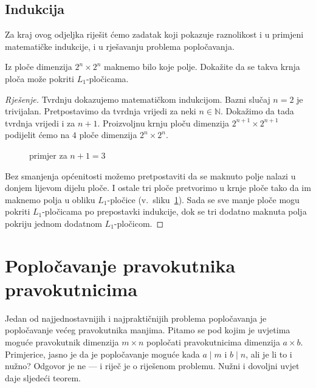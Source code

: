 \documentclass[11pt]{scrartcl}
\begin{document}
\subsection{Indukcija}
Za kraj ovog odjeljka riješit ćemo zadatak koji pokazuje raznolikost i u primjeni matematičke indukcije, i u rješavanju problema popločavanja.

\begin{zadatak} Iz ploče dimenzija $2^n \times 2^n$ maknemo bilo koje polje. Dokažite da se takva krnja ploča može pokriti $L_1$-pločicama.
\end{zadatak}

\begin{proof}[Rješenje]
Tvrdnju dokazujemo matematičkom indukcijom. Bazni slučaj $n = 2$ je trivijalan. Pretpostavimo da tvrdnja vrijedi za neki $n \in \mathbb{N}$. Dokažimo da tada tvrdnja vrijedi i za $n+1$. Proizvoljnu krnju ploču dimenzija $2^{n+1} \times 2^{n+1}$ podijelit ćemo na $4$ ploče dimenzija $2^n \times 2^n$.
\begin{figure}[h!]
\centering
{}
\caption{primjer za $n + 1= 3$}
\label{fig:indukcija}
\end{figure}
Bez smanjenja općenitosti možemo pretpostaviti da se maknuto polje nalazi u donjem lijevom dijelu ploče. I ostale tri ploče pretvorimo u krnje ploče tako da im maknemo polja u obliku $L_1$-pločice (v.\ sliku~\ref{fig:indukcija}). Sada se sve manje ploče mogu pokriti $L_1$-pločicama po prepostavki indukcije, dok se tri dodatno maknuta polja pokriju jednom dodatnom $L_1$-pločicom.
\end{proof}

\section{Popločavanje pravokutnika pravokutnicima}
Jedan od najjednostavnijih i najpraktičnijih problema popločavanja je popločavanje većeg pravokutnika manjima. Pitamo se pod kojim je uvjetima moguće pravokutnik dimenzija $m \times n$ popločati pravokutnicima dimenzija $a \times b$. Primjerice, jasno je da je popločavanje moguće kada $a \mid m$ i $b \mid n$, ali je li to i nužno? Odgovor je ne --- i riječ je o riješenom problemu. Nužni i dovoljni uvjet daje sljedeći teorem.
\end{document}
